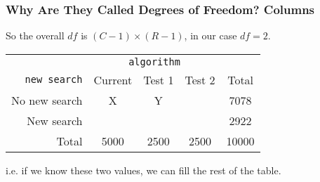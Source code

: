 \documentclass[handout]{beamer}
\begin{document}
\begin{frame}
\frametitle{Why Are They Called Degrees of Freedom? Columns}

So the overall $df$ is $(C-1)\times(R-1)$, in our case $df=2$.

\vspace{0.5cm}

\begin{center}
  \begin{tabular}{r|ccc|c}
& \multicolumn{3}{c|}{{\tt algorithm}} & \\
       {\tt new search} & Current & Test 1 & Test 2 & Total \\ 
\hline
    No new search & X & Y &  & 7078 \\ 
    New search &  &  &  & 2922 \\ 
\hline
    Total & 5000 & 2500 & 2500 & 10000 \\ 
  \end{tabular}
\end{center}
\pause
i.e. if we know these two values, we can fill the rest of the table.

\end{frame}
\end{document}
